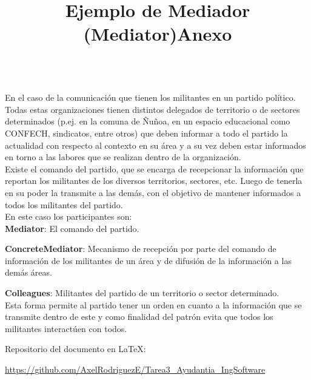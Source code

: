 \documentclass[a4paper,10pt]{report}
\begin{document}
\title{\textbf{Ejemplo de Mediador (Mediator)}}\\


En el caso de la comunicación que tienen los militantes en un partido político. Todas estas organizaciones tienen distintos delegados de territorio o de sectores determinados (p.ej. en la comuna de Ñuñoa, en un espacio educacional como CONFECH, sindicatos, entre otros) que deben informar a todo el partido la actualidad con respecto al contexto en su área y a su vez deben estar informados en torno a las labores que se realizan dentro de la organización.\\

Existe el comando del partido, que se encarga de recepcionar la información que reportan los militantes de los diversos territorios, sectores, etc. Luego de tenerla en su poder la transmite a las demás, con el objetivo de mantener informados a todos los militantes del partido.\\

En este caso los participantes son:\\

\textbf{Mediator}: El comando del partido.

\textbf{ConcreteMediator}: Mecanismo de recepción por parte del comando de información de los militantes de un área y de difusión de la información a las demás áreas.

\textbf{Colleagues}: Militantes del partido de un territorio o sector determinado.\\

Esta forma permite al partido tener un orden en cuanto a la información que se transmite dentro de este y como finalidad del patrón evita que todos los militantes interactúen con todos.\\


\title{\textbf{Anexo\\}}

Repositorio del documento en \LaTeX:

\url{https://github.com/AxelRodriguezE/Tarea3_Ayudantia_IngSoftware}
\end{document}
